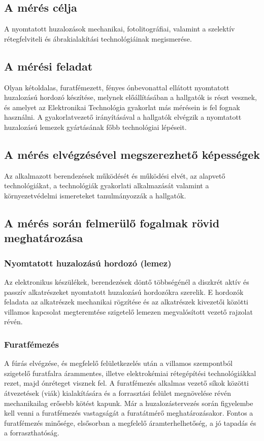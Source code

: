 \documentclass[../labor.tex]{subfiles}
\begin{document}
    \subsection{A mérés célja} A nyomtatott huzalozások mechanikai, fotolitográfiai, valamint a szelektív rétegfelviteli és ábrakialakítási technológiáinak megismerése.

    \subsection{A mérési feladat} Olyan kétoldalas, furatfémezett, fényes ónbevonattal ellátott nyomtatott	huzalozású hordozó készítése, melynek előállításában a hallgatók is részt vesznek, és amelyet az Elektronikai Technológia gyakorlat más mérésein is fel fognak használni. A gyakorlatvezető irányításával a hallgatók elvégzik a nyomtatott huzalozású lemezek gyártásának főbb technológiai lépéseit.

    \subsection{A mérés elvégzésével megszerezhető képességek} Az alkalmazott berendezések működését és működési elvét, az alapvető technológiákat, a technológiák gyakorlati alkalmazását valamint a környezetvédelmi ismereteket tanulmányozzák a hallgatók.
    
    \subsection{A mérés során felmerülő fogalmak rövid meghatározása}

    \subsubsection{Nyomtatott huzalozású hordozó (lemez)} Az elektronikus készülékek, berendezések döntő többségénél a diszkrét aktív és passzív alkatrészeket nyomtatott huzalozású hordozókra szerelik. E hordozók feladata az alkatrészek mechanikai rögzítése és az alkatrészek kivezetői közötti villamos kapcsolat megteremtése szigetelő lemezen megvalósított vezető rajzolat révén.

    \subsubsection{Furatfémezés} A fúrás elvégzése, és megfelelő felületkezelés után a villamos szempontból szigetelő furatfalra árammentes, illetve elektrokémiai rétegépítési technológiákkal rezet, majd ónréteget visznek fel. A furatfémezés alkalmas vezető síkok közötti átvezetések (viák) kialakítására és a forrasztási felület megnövelése révén mechanikailag erősebb kötést kapunk. Már a huzalozástervezés során figyelembe kell venni a furatfémezés vastagságát a furatátmérő meghatározásakor. Fontos a furatfémezés minősége, elsősorban a megfelelő áramterhelhetőség, a jó tapadás és a forraszthatóság.
\end{document}
